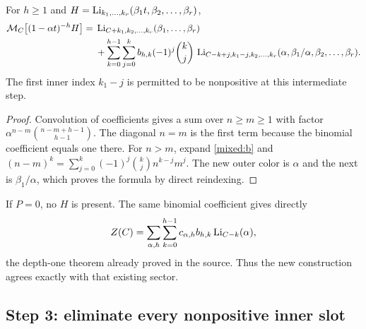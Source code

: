 \begin{lemma}\label{mixed:prefactor}
For $h\ge1$ and $H=\operatorname{Li}_{k_1,\ldots,k_r}
(\beta_1t,\beta_2,\ldots,\beta_r)$,
\begin{align}\label{mixed:prefactorformula}
 \mathcal M_C\bigl[(1-\alpha t)^{-h}H\bigr]
 ={}&\operatorname{Li}_{C+k_1,k_2,\ldots,k_r}(\beta_1,\ldots,\beta_r)\notag\\
 &+\sum_{k=0}^{h-1}\sum_{j=0}^k
 b_{h,k}(-1)^j\binom kj\,
 \operatorname{Li}_{C-k+j,k_1-j,k_2,\ldots,k_r}
       (\alpha,\beta_1/\alpha,\beta_2,\ldots,\beta_r).
\end{align}
The first inner index $k_1-j$ is permitted to be nonpositive at this
intermediate step.
\end{lemma}
\begin{proof}
Convolution of coefficients gives a sum over $n\ge m\ge1$ with
factor $\alpha^{n-m}\binom{n-m+h-1}{h-1}$. The diagonal $n=m$
is the first term because the binomial coefficient equals one there.
For $n>m$, expand \eqref{mixed:b} and
$(n-m)^k=\sum_{j=0}^k(-1)^j\binom kj n^{k-j}m^j$.
The new outer color is $\alpha$ and the next is $\beta_1/\alpha$,
which proves the formula by direct reindexing.
\end{proof}

If $P=0$, no $H$ is present. The same binomial coefficient gives
directly
\begin{equation}\label{mixed:rationalonly}
 Z(C)=\sum_{\alpha,h}\sum_{k=0}^{h-1}
                    c_{\alpha,h}b_{h,k}\operatorname{Li}_{C-k}(\alpha),
\end{equation}
the depth-one theorem already proved in the source. Thus the new
construction agrees exactly with that existing sector.

\subsection{Step 3: eliminate every nonpositive inner slot}

